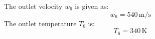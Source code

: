 The outlet velocity \( w_6 \) is given as:
\[
w_6 = 540 \, \text{m/s}
\]
The outlet temperature \( T_6 \) is:
\[
T_6 = 340 \, \text{K}
\]